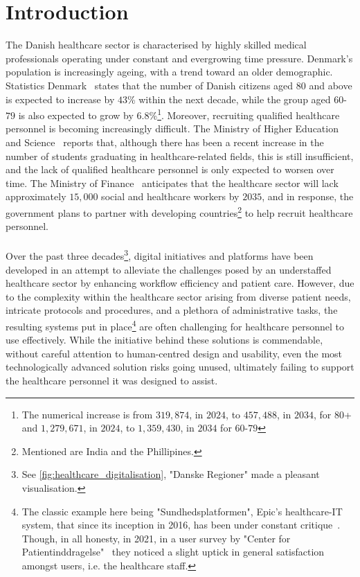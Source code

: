 \section{Introduction}
The Danish healthcare sector is characterised by highly skilled medical professionals operating under constant and evergrowing time pressure.
Denmark's population is increasingly ageing, with a trend toward an older demographic. Statistics Denmark~\cite{dst-older-pop} states that the number of Danish citizens aged $80$ and above is expected to increase by $43$\% within the next decade, while the group aged $60$-$79$ is also expected to grow by $6.8$\%\footnote{The numerical increase is from $319,874$, in $2024$, to $457,488$, in $2034$, for $80$+ and $1,279,671$, in $2024$, to $1,359,430$, in $2034$ for $60$-$79$}. Moreover, recruiting qualified healthcare personnel is becoming increasingly difficult. The Ministry of Higher Education and Science~\cite{MoHEaS-healthcare-rectruitment} reports that, although there has been a recent increase in the number of students graduating in healthcare-related fields, this is still insufficient, and the lack of qualified healthcare personnel is only expected to worsen over time. The Ministry of Finance~\cite{MoHEaS-healthcare-rectruitment} anticipates that the healthcare sector will lack approximately $15,000$ social and healthcare workers by $2035$, and in response, the government plans to partner with developing countries\footnote{Mentioned are India and the Phillipines.} to help recruit healthcare personnel.
\\
\\
Over the past three decades\footnote{See \autoref{fig:healthcare_digitalisation}, "Danske Regioner" made a pleasant visualisation.}, digital initiatives and platforms have been developed in an attempt to alleviate the challenges posed by an understaffed healthcare sector by enhancing workflow efficiency and patient care. However, due to the complexity within the healthcare sector arising from diverse patient needs, intricate protocols and procedures, and a plethora of administrative tasks, the resulting systems put in place\footnote{The classic example here being "Sundhedsplatformen", Epic's healthcare-IT system, that since its inception in 2016, has been under constant critique~\cite{DR-healthcare-platform, Altinget-healthcare-platform, TV2-healthcare-platform}. Though, in all honesty, in 2021, in a user survey by "Center for Patientinddragelse"~\cite{SP-user-survey} they noticed a slight uptick in general satisfaction amongst users, i.e. the healthcare staff.} are often challenging for healthcare personnel to use effectively. While the initiative behind these solutions is commendable, without careful attention to human-centred design and usability, even the most technologically advanced solution risks going unused, ultimately failing to support the healthcare personnel it was designed to assist.
